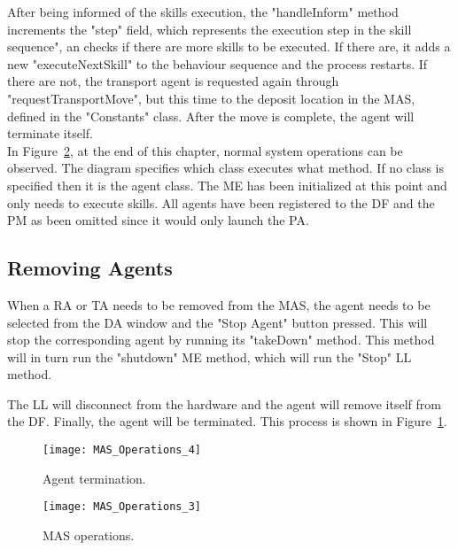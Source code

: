 After being informed of the skills execution, the "handleInform" method increments the "step" field, which represents the execution step in the skill sequence", an checks if there are more skills to be executed. If there are, it adds a new "executeNextSkill" to the behaviour sequence and the process restarts. If there are not, the transport agent is requested again through "requestTransportMove", but this time to the deposit location in the \acrshort{MAS}, defined in the "Constants" class. After the move is complete, the agent will terminate itself.\\

In Figure~\ref{fig:mas_operations_3}, at the end of this chapter, normal system operations can be observed. The diagram specifies which class executes what method. If no class is specified then it is the agent class. The \acrshort{ME} has been initialized at this point and only needs to execute skills. All agents have been registered to the \acrshort{DF} and the \acrshort{PM} as been omitted since it would only launch the \acrlong{PA}.\\

\subsection{Removing Agents}

When a \acrlong{RA} or \acrlong{TA} needs to be removed from the \acrshort{MAS}, the agent needs to be selected from the \acrshort{DA} window and the "Stop Agent" button pressed. This will stop the corresponding agent by running its "takeDown" method. This method will in turn run the "shutdown" \acrlong{ME} method, which will run the "Stop" \acrshort{LL} method. 

The \acrshort{LL} will disconnect from the hardware and the agent will remove itself from the \acrshort{DF}. Finally, the agent will be terminated. This process is shown in Figure~\ref{fig:mas_operations_4}.\\

\begin{figure}[h!]
	\centering
	\texttt{[image: MAS\_Operations\_4]}
	\caption{Agent termination.}
	\label{fig:mas_operations_4}
\end{figure}

\begin{figure}[p]
	\centering
	\texttt{[image: MAS\_Operations\_3]}
	\caption{\acrlong{MAS} operations.}
	\label{fig:mas_operations_3}
\end{figure}
